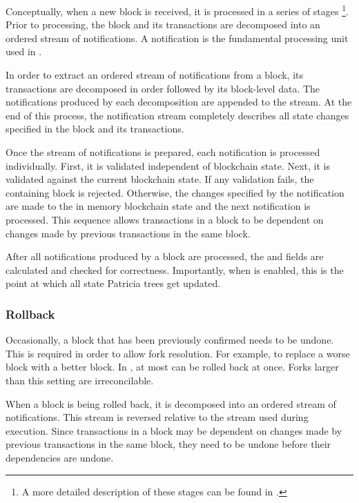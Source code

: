 Conceptually, when a new block is received, it is processed in a series of stages
\footnote{A more detailed description of these stages can be found in .}.
Prior to processing, the block and its transactions are decomposed into an ordered stream of notifications.
A notification is the fundamental processing unit used in \codename.

In order to extract an ordered stream of notifications from a block, its transactions are decomposed in order followed by its block-level data.
The notifications produced by each decomposition are appended to the stream.
At the end of this process, the notification stream completely describes all state changes specified in the block and its transactions.

Once the stream of notifications is prepared, each notification is processed individually.
First, it is validated independent of blockchain state.
Next, it is validated against the current blockchain state.
If any validation fails, the containing block is rejected.
Otherwise, the changes specified by the notification are made to the in memory blockchain state and the next notification is processed.
This sequence allows transactions in a block to be dependent on changes made by previous transactions in the same block.

After all notifications produced by a block are processed, the   and   fields are calculated and checked for correctness.
Importantly, when  is enabled, this is the point at which all state Patricia trees get updated.

\subsubsection*{Rollback}

Occasionally, a block that has been previously confirmed needs to be undone.
This is required in order to allow fork resolution.
For example, to replace a worse block with a better block.
In \codename, at most  can be rolled back at once.
Forks larger than this setting are irreconcilable.

When a block is being rolled back, it is decomposed into an ordered stream of notifications.
This stream is reversed relative to the stream used during execution.
Since transactions in a block may be dependent on changes made by previous transactions in the same block, they need to be undone before their dependencies are undone.

